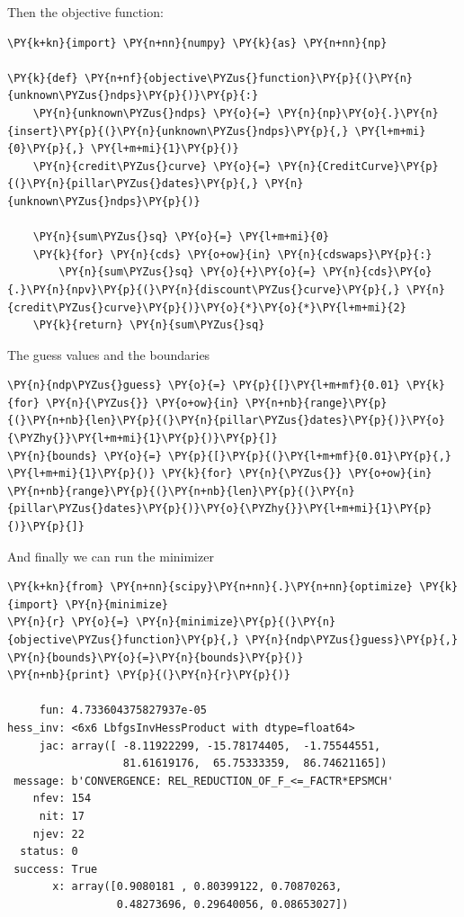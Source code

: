 Then the objective function:
\begin{codebox}
\begin{Verbatim}[commandchars=\\\{\}]
\PY{k+kn}{import} \PY{n+nn}{numpy} \PY{k}{as} \PY{n+nn}{np}

\PY{k}{def} \PY{n+nf}{objective\PYZus{}function}\PY{p}{(}\PY{n}{unknown\PYZus{}ndps}\PY{p}{)}\PY{p}{:}
    \PY{n}{unknown\PYZus{}ndps} \PY{o}{=} \PY{n}{np}\PY{o}{.}\PY{n}{insert}\PY{p}{(}\PY{n}{unknown\PYZus{}ndps}\PY{p}{,} \PY{l+m+mi}{0}\PY{p}{,} \PY{l+m+mi}{1}\PY{p}{)}
    \PY{n}{credit\PYZus{}curve} \PY{o}{=} \PY{n}{CreditCurve}\PY{p}{(}\PY{n}{pillar\PYZus{}dates}\PY{p}{,} \PY{n}{unknown\PYZus{}ndps}\PY{p}{)}
    
    \PY{n}{sum\PYZus{}sq} \PY{o}{=} \PY{l+m+mi}{0}
    \PY{k}{for} \PY{n}{cds} \PY{o+ow}{in} \PY{n}{cdswaps}\PY{p}{:}    
        \PY{n}{sum\PYZus{}sq} \PY{o}{+}\PY{o}{=} \PY{n}{cds}\PY{o}{.}\PY{n}{npv}\PY{p}{(}\PY{n}{discount\PYZus{}curve}\PY{p}{,} \PY{n}{credit\PYZus{}curve}\PY{p}{)}\PY{o}{*}\PY{o}{*}\PY{l+m+mi}{2}
    \PY{k}{return} \PY{n}{sum\PYZus{}sq}
\end{Verbatim}
\end{codebox}

The guess values and the boundaries
\begin{codebox}
\begin{Verbatim}[commandchars=\\\{\}]
\PY{n}{ndp\PYZus{}guess} \PY{o}{=} \PY{p}{[}\PY{l+m+mf}{0.01} \PY{k}{for} \PY{n}{\PYZus{}} \PY{o+ow}{in} \PY{n+nb}{range}\PY{p}{(}\PY{n+nb}{len}\PY{p}{(}\PY{n}{pillar\PYZus{}dates}\PY{p}{)}\PY{o}{\PYZhy{}}\PY{l+m+mi}{1}\PY{p}{)}\PY{p}{]}
\PY{n}{bounds} \PY{o}{=} \PY{p}{[}\PY{p}{(}\PY{l+m+mf}{0.01}\PY{p}{,} \PY{l+m+mi}{1}\PY{p}{)} \PY{k}{for} \PY{n}{\PYZus{}} \PY{o+ow}{in} \PY{n+nb}{range}\PY{p}{(}\PY{n+nb}{len}\PY{p}{(}\PY{n}{pillar\PYZus{}dates}\PY{p}{)}\PY{o}{\PYZhy{}}\PY{l+m+mi}{1}\PY{p}{)}\PY{p}{]}
\end{Verbatim}
\end{codebox}

And finally we can run the minimizer
\begin{codebox}
\begin{Verbatim}[commandchars=\\\{\}]
\PY{k+kn}{from} \PY{n+nn}{scipy}\PY{n+nn}{.}\PY{n+nn}{optimize} \PY{k}{import} \PY{n}{minimize}
\PY{n}{r} \PY{o}{=} \PY{n}{minimize}\PY{p}{(}\PY{n}{objective\PYZus{}function}\PY{p}{,} \PY{n}{ndp\PYZus{}guess}\PY{p}{,} \PY{n}{bounds}\PY{o}{=}\PY{n}{bounds}\PY{p}{)}
\PY{n+nb}{print} \PY{p}{(}\PY{n}{r}\PY{p}{)}

     fun: 4.733604375827937e-05
hess_inv: <6x6 LbfgsInvHessProduct with dtype=float64>
     jac: array([ -8.11922299, -15.78174405,  -1.75544551,  
                  81.61619176,  65.75333359,  86.74621165])
 message: b'CONVERGENCE: REL_REDUCTION_OF_F_<=_FACTR*EPSMCH'
    nfev: 154
     nit: 17
    njev: 22
  status: 0
 success: True
       x: array([0.9080181 , 0.80399122, 0.70870263, 
                 0.48273696, 0.29640056, 0.08653027])
\end{Verbatim}
\end{codebox}

